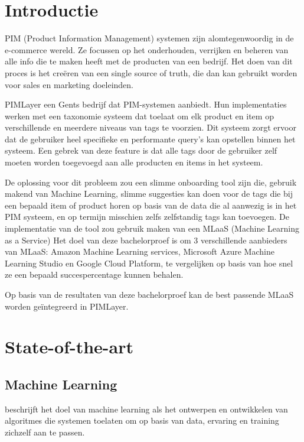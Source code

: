 
\section{Introductie}%
\label{sec:introductie}

PIM (Product Information Management) systemen zijn alomtegenwoordig in de e-commerce wereld. Ze focussen op het onderhouden, verrijken en beheren van alle info die te maken heeft met de producten van een bedrijf. Het doen van dit proces is het creëren van een single source of truth, die dan kan gebruikt worden voor sales en marketing doeleinden. \autocite{Matilla2018}

PIMLayer een Gents bedrijf dat PIM-systemen aanbiedt. Hun implementaties werken met een taxonomie systeem dat toelaat om elk product en item op verschillende en meerdere niveaus van tags te voorzien. \autocite{AwareNV2022} Dit systeem zorgt ervoor dat de gebruiker heel specifieke en performante query's kan opstellen binnen het systeem. Een gebrek van deze feature is dat alle tags door de gebruiker zelf moeten worden toegevoegd aan alle producten en items in het systeem.


De oplossing voor dit probleem zou een slimme onboarding tool zijn die, gebruik makend van Machine Learning, slimme suggesties kan doen voor de tags die bij een bepaald item of product horen op basis van de data die al aanwezig is in het PIM systeem, en op termijn misschien zelfs zelfstandig tags kan toevoegen. De implementatie van de tool zou gebruik maken van een MLaaS (Machine Learning as a Service)  Het doel van deze bachelorproef is om 3 verschillende aanbieders van MLaaS: Amazon Machine Learning services, Microsoft Azure Machine Learning Studio en Google Cloud Platform, te vergelijken op basis van hoe snel ze een bepaald succespercentage kunnen behalen. 

Op basis van de resultaten van deze bachelorproef kan de best passende MLaaS worden geïntegreerd  in PIMLayer.




\section{State-of-the-art}%
\label{sec:state-of-the-art}

\subsection{Machine Learning}
\textcite{Hu2013} beschrijft het doel van machine learning als het ontwerpen en ontwikkelen van algoritmes die systemen toelaten om op basis van data, ervaring en training zichzelf aan te passen. 
